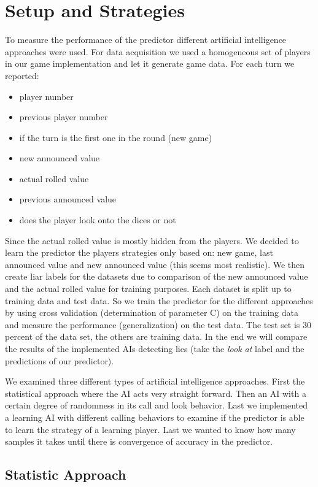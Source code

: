 \documentclass[11pt]{article}
\begin{document}
\section{Setup and Strategies}
To measure the performance of the predictor different artificial intelligence approaches were used. For data acquisition we used a homogeneous set of players in our game implementation and let it generate game data. For each turn we reported:
\begin{itemize}
	\item player number
	\item previous player number
	\item if the turn is the first one in the round (new game)
	\item new announced value
	\item actual rolled value
	\item previous announced value
	\item does the player look onto the dices or not
\end{itemize}
Since the actual rolled value is mostly hidden from the players. We decided to learn the predictor the players strategies only based on: new game, last announced value and new announced value (this seems most realistic).
We then create liar labels for the datasets due to comparison of the new announced value and the actual rolled value for training purposes.
Each dataset is split up to training data and test data. So we train the predictor for the different approaches by using cross validation (determination of parameter C) on the training data and measure the performance (generalization) on the test data. The test set is 30 percent of the data set, the others are training data.
In the end we will compare the results of the implemented AIs detecting lies (take the \textit{look at} label and the predictions of our predictor).

We examined three different types of artificial intelligence approaches. First the statistical approach where the AI acts very straight forward. Then an AI with a certain degree of randomness in its call and look behavior. Last we implemented a learning AI with different calling behaviors to examine if the predictor is able to learn the strategy of a learning player. Last we wanted to know how many samples it takes until there is convergence of accuracy in the predictor. 

\subsection{Statistic Approach}
\end{document}
